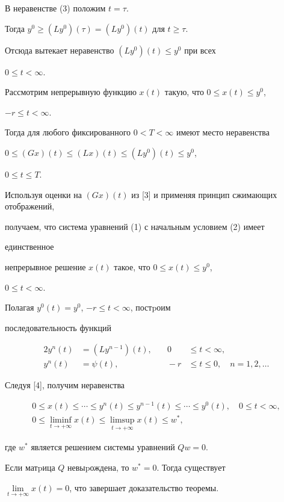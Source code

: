 \begin{pf}


В неравенстве (3) положим $t=\tau$.


Тогда $y^0 \ge (Ly^0)(\tau)=(Ly^0)(t)$ для $t \ge\tau$.


Отсюда вытекает неравенство $(Ly^0)(t)\le y^0$ при всех


$0 \le t<\infty$.


Рассмотрим непрерывную функцию $x(t)$ такую, что $0 \le x(t) \le y^0$,


$-r\leq t < \infty$.


Тогда для любого фиксированного $0 < T < \infty$ имеют место неравенства


$0 \le (Gx)(t) \le (Lx)(t) \le (Ly^0)(t) \le y^0$,


$0 \le t \le T$.


Используя оценки на $(Gx)(t)$ из [3] и применяя принцип сжимающих отображений,


получаем, что система уравнений (1) с начальным условием (2) имеет 


единственное


непрерывное решение $x(t)$ такое, что $0 \le x(t) \le y^0$,


$0 \le t < \infty$.


Полагая $y^0(t)=y^0$, $-r\le t<\infty$, постpоим 


последовательность функций


\begin{alignat*}{2}


y^n(t) &= (Ly^{n-1})(t), &\quad 0 &\le t < \infty,\\


y^n(t) &= \psi(t), &\quad -r &\le t \le 0, \quad n=1,2,\dotsc


\end{alignat*}


Следуя [4], получим неравенства


\begin{gather*}


0 \le x(t) \le \dotsb \le y^{n}(t) \le y^{n-1}(t) \le \dotsb \le y^{0}(t),


\quad 0 \le t < \infty,\\


0 \le \liminf_{t\to +\infty} x(t) \le \limsup_{t\to +\infty} x(t) \le w^{*},


\end{gather*}


где $w^*$ является решением системы уравнений $Qw=0$.


Если матpица $Q$ невыpождена, то $w^*=0$. Тогда существует


$\lim\limits_{t\to +\infty}x(t)=0$, что завершает доказательство теоремы.


\end{pf}






